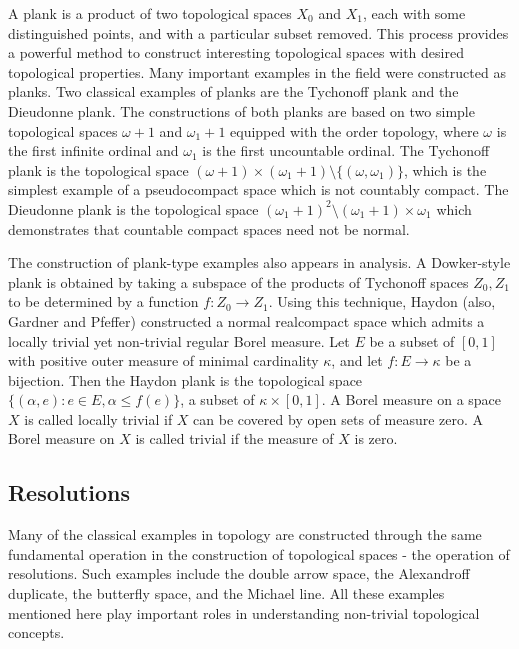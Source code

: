   A plank is a product of two topological spaces \(X_0\) and \(X_1\), each with
  some distinguished points, and with a particular subset removed. This process
  provides a powerful method to construct interesting topological spaces with
  desired topological properties. Many important examples in the field
  were constructed as planks. Two classical examples of planks are the
  Tychonoff plank and the Dieudonne plank.
  The constructions of both planks are based on two simple
  topological spaces \(\omega+1\) and \(\omega_1+1\) equipped with the order
  topology, where \(\omega\) is the first infinite ordinal and
  \(\omega_1\) is the first uncountable ordinal. The Tychonoff plank
  \cite[pp. 122-123]{MR0264581} \cite{MR1512425} is the topological space
  \((\omega+1 )\times (\omega_1+1)\setminus \{(\omega, \omega_1)\}\),
  which is the simplest example of a pseudocompact space which is not
  countably compact. The Dieudonne plank \cite{MR0013297} \cite[Ex38]{MR1382863}
  is the topological space
  \((\omega_1+1)^2\setminus (\omega_1+1)\times \omega_1\) which demonstrates
  that countable compact spaces need not be normal.

  The construction of plank-type examples also appears in analysis. A
  Dowker-style plank is obtained by taking a subspace of the products of
  Tychonoff spaces \(Z_0,Z_1\) to be determined by a function
  \(f:Z_0\to Z_1\). Using this technique, Haydon (also, Gardner and Pfeffer)
  constructed a normal realcompact space which admits a locally trivial yet
  non-trivial regular Borel measure. Let \(E\) be a subset of \([0, 1]\) with
  positive outer measure of minimal cardinality \(\kappa\), and
  let \(f: E\rightarrow \kappa\) be a bijection. Then the Haydon plank is the
  topological space \(\{(\alpha, e): e\in E, \alpha\leq f(e)\}\), a
  subset of \(\kappa\times [0, 1]\). A Borel measure on a space \(X\) is called
  locally trivial if \(X\) can be covered by open sets of measure zero. A
  Borel measure on \(X\) is called trivial if the measure of \(X\) is zero.

  \subsection{Resolutions}

  Many of the classical examples in topology are constructed
  through the same fundamental operation in the construction of topological spaces -
  the operation of resolutions.  Such examples include the double arrow space,
  the Alexandroff duplicate, the butterfly space, and the Michael line. All these
  examples mentioned here play important roles in understanding non-trivial
  topological concepts.

